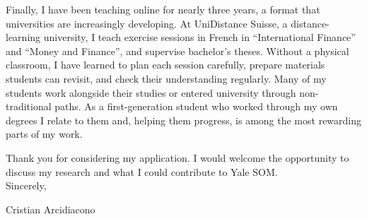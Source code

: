 \documentclass[11pt]{article}
\begin{document}
Finally, I have been teaching online for nearly three years, a format that universities are increasingly developing. At UniDistance Suisse, a distance-learning university, I teach exercise sessions in French in ``International Finance'' and ``Money and Finance'', and supervise bachelor's theses. Without a physical classroom, I have learned to plan each session carefully, prepare materials students can revisit, and check their understanding regularly. Many of my students work alongside their studies or entered university through non-traditional paths. As a first-generation student who worked through my own degrees I relate to them and, helping them progress, is among the most rewarding parts of my work. %

Thank you for considering my application. I would welcome the opportunity to discuss my research and what I could contribute to Yale SOM. \\

Sincerely,

Cristian Arcidiacono
\end{document}
